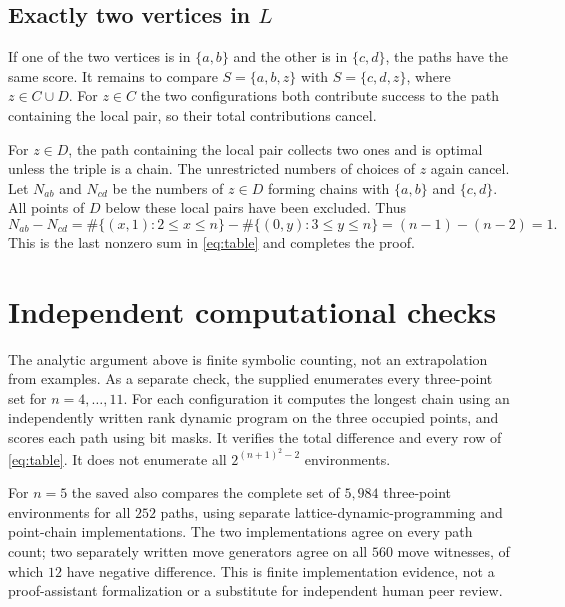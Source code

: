 \documentclass[11pt,a4paper]{article}
\begin{document}
\subsection{Exactly two vertices in \texorpdfstring{$L$}{L}}
If one of the two vertices is in $\{a,b\}$ and the other is in
$\{c,d\}$, the paths have the same score. It remains to compare
$S=\{a,b,z\}$ with $S=\{c,d,z\}$, where $z\in C\cup D$.
For $z\in C$ the two configurations both contribute success to the
path containing the local pair, so their total contributions cancel.

For $z\in D$, the path containing the local pair collects two ones
and is optimal unless the triple is a chain. The unrestricted numbers
of choices of $z$ again cancel. Let $N_{ab}$ and $N_{cd}$ be the
numbers of $z\in D$ forming chains with $\{a,b\}$ and $\{c,d\}$.
All points of $D$ below these local pairs have been excluded. Thus
\[
 N_{ab}-N_{cd}
 =\#\{(x,1):2\le x\le n\}
  -\#\{(0,y):3\le y\le n\}
 =(n-1)-(n-2)=1.
\]
This is the last nonzero sum in \eqref{eq:table} and completes the proof.

\section{Independent computational checks}
The analytic argument above is finite symbolic counting, not an
extrapolation from examples. As a separate check, the supplied
 enumerates every three-point set for
$n=4,\ldots,11$. For each configuration it computes the longest
chain using an independently written rank dynamic program on the
three occupied points, and scores each path using bit masks.
It verifies the total difference and every row of \eqref{eq:table}.
It does not enumerate all $2^{(n+1)^2-2}$ environments.

For $n=5$ the saved  also compares
the complete set of $5{,}984$ three-point environments for all
$252$ paths, using separate lattice-dynamic-programming and
point-chain implementations. The two implementations agree on
every path count; two separately written move generators agree on
all $560$ move witnesses, of which $12$ have negative difference.
This is finite implementation evidence, not a proof-assistant
formalization or a substitute for independent human peer review.
\end{document}

